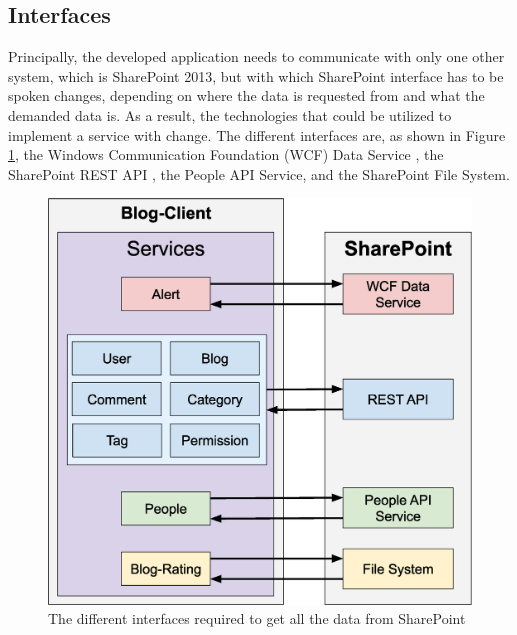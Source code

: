 \documentclass[Bachelor,BIF,english]{twbook}
\begin{document}
\subsection{Interfaces}
Principally, the developed application needs to communicate with only one other system, which is SharePoint 2013, but with which SharePoint interface has to be spoken changes, depending on where the data is requested from and what the demanded data is. As a result, the technologies that could be utilized to implement a service with change. The different interfaces are, as shown in Figure \ref{Fig7}, the Windows Communication Foundation (WCF) Data Service \cite{SPWcf}, the SharePoint REST API \cite{SPRest}, the People API Service, and the SharePoint File System.
\\[\baselineskip]
\begin{figure}[!htbp]
\centering
\includegraphics[width=0.625\linewidth]{PICs/communication_sharepoint_services.eps}
\caption{The different interfaces required to get all the data from SharePoint}\label{Fig7}
\end{figure}
\end{document}
